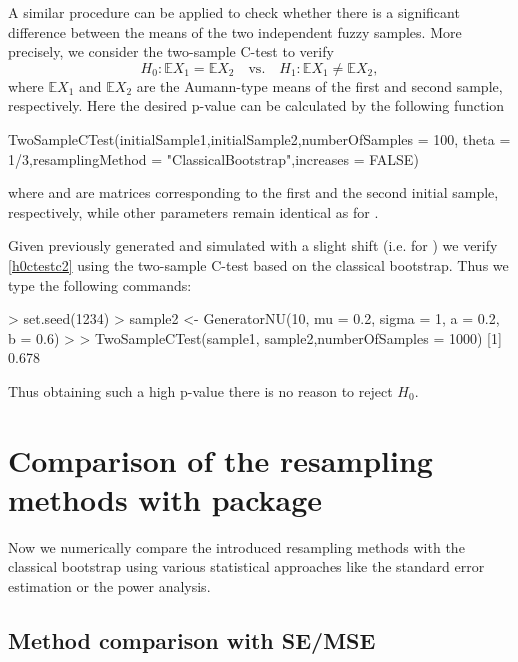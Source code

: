 A similar procedure can be applied to check whether there is a significant difference between the means of the two independent fuzzy samples. More precisely, we consider the two-sample C-test \citep{LUBIANO2016918} to verify
\begin{equation}
\label{h0ctestc2}
	H_0 : \mathbb{E} X_1 = \mathbb{E} X_2 \quad\text{vs.}\quad H_1 : \mathbb{E} X_1 \not = \mathbb{E} X_2 ,
\end{equation}
where $\mathbb{E} X_1$ and $\mathbb{E} X_2$ are the Aumann-type means of the first and second sample, respectively.
Here the desired p-value can be calculated by the following function
\begin{example}
TwoSampleCTest(initialSample1,initialSample2,numberOfSamples = 100,
 theta = 1/3,resamplingMethod = "ClassicalBootstrap",increases = FALSE)
\end{example}
where  and  are matrices corresponding to the first and the second initial sample, respectively, while other parameters remain identical as for .

Given previously generated  and  simulated with a slight shift (i.e. for ) we verify \eqref{h0ctestc2} using the two-sample C-test based on the classical bootstrap. Thus we type the following commands:
\begin{example}
> set.seed(1234)
> sample2 <- GeneratorNU(10, mu = 0.2, sigma = 1, a = 0.2, b = 0.6)
> 
> TwoSampleCTest(sample1, sample2,numberOfSamples = 1000)
[1] 0.678
\end{example}
Thus obtaining such a high p-value there is no reason to reject $H_0$.




\section{Comparison of the resampling methods with  package}

Now we numerically compare the introduced resampling methods with the classical bootstrap using various statistical approaches like the standard error estimation or the power analysis.


\subsection{Method comparison with SE/MSE}

